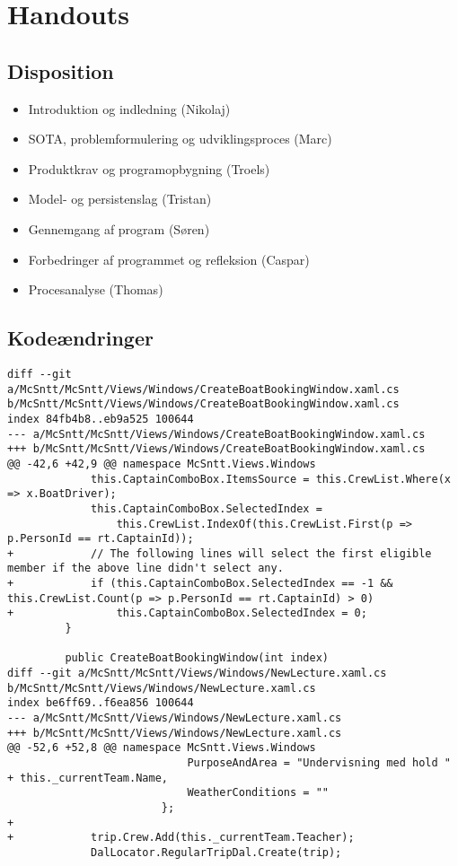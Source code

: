 \documentclass[a4paper,11pt,fleqn,twoside,openright,final]{memoir}
\begin{document}
\sloppy


\chapter{Handouts}

\section{Disposition}

	\begin{itemize}
	\item Introduktion og indledning (Nikolaj)
	\item SOTA, problemformulering og udviklingsproces (Marc)
	\item Produktkrav og programopbygning (Troels)
	\item Model- og persistenslag (Tristan)
	\item Gennemgang af program (Søren)
	\item Forbedringer af programmet og refleksion (Caspar)
	\item Procesanalyse	(Thomas)
	\end{itemize}

\newpage
\section{Kodeændringer}
\begin{lstlisting}[frame=single, caption=Forsidens Code-Behind, label=fntpg-cb]
diff --git a/McSntt/McSntt/Views/Windows/CreateBoatBookingWindow.xaml.cs b/McSntt/McSntt/Views/Windows/CreateBoatBookingWindow.xaml.cs
index 84fb4b8..eb9a525 100644
--- a/McSntt/McSntt/Views/Windows/CreateBoatBookingWindow.xaml.cs
+++ b/McSntt/McSntt/Views/Windows/CreateBoatBookingWindow.xaml.cs
@@ -42,6 +42,9 @@ namespace McSntt.Views.Windows
             this.CaptainComboBox.ItemsSource = this.CrewList.Where(x => x.BoatDriver);
             this.CaptainComboBox.SelectedIndex =
                 this.CrewList.IndexOf(this.CrewList.First(p => p.PersonId == rt.CaptainId));
+            // The following lines will select the first eligible member if the above line didn't select any.
+            if (this.CaptainComboBox.SelectedIndex == -1 && this.CrewList.Count(p => p.PersonId == rt.CaptainId) > 0) 
+                this.CaptainComboBox.SelectedIndex = 0;
         }
 
         public CreateBoatBookingWindow(int index)
diff --git a/McSntt/McSntt/Views/Windows/NewLecture.xaml.cs b/McSntt/McSntt/Views/Windows/NewLecture.xaml.cs
index be6ff69..f6ea856 100644
--- a/McSntt/McSntt/Views/Windows/NewLecture.xaml.cs
+++ b/McSntt/McSntt/Views/Windows/NewLecture.xaml.cs
@@ -52,6 +52,8 @@ namespace McSntt.Views.Windows
                            PurposeAndArea = "Undervisning med hold " + this._currentTeam.Name,
                            WeatherConditions = ""
                        };
+
+            trip.Crew.Add(this._currentTeam.Teacher);
             DalLocator.RegularTripDal.Create(trip);
\end{lstlisting}
\end{document}
